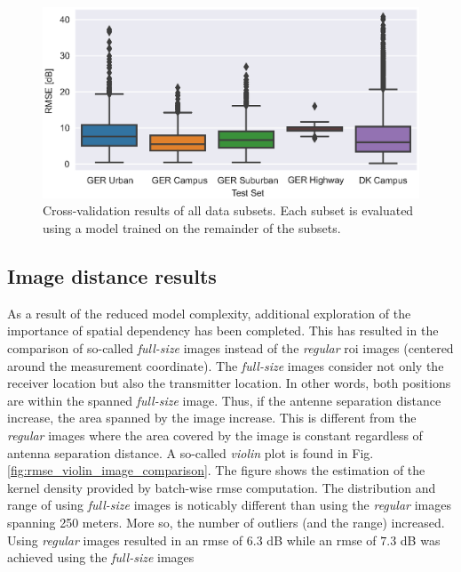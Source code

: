 \begin{figure}[h]
    \centering
    \includegraphics{chapters/part_pathloss/osm_images_paper/figures/RMSE_boxplot.eps}
    \caption{Cross-validation results of all data subsets. Each subset is evaluated using a model trained on the remainder of the subsets.}
    \label{fig:rmse_boxplot_osm}
\end{figure}

\subsection{Image distance results}
As a result of the reduced model complexity, additional exploration of the importance of spatial dependency has been completed. This has resulted in the comparison of so-called \emph{full-size} images instead of the \emph{regular} \gls{roi} images (centered around the measurement coordinate). The \emph{full-size} images consider not only the receiver location but also the transmitter location. In other words, both positions are within the spanned \emph{full-size} image. Thus, if the antenne separation distance increase, the area spanned by the image increase. This is different from the \emph{regular} images where the area covered by the image is constant regardless of antenna separation distance. A so-called \emph{violin} plot is found in Fig. \ref{fig:rmse_violin_image_comparison}. The figure shows the estimation of the kernel density provided by batch-wise \gls{rmse} computation. The distribution and range of using \emph{full-size} images is noticably different than using the \emph{regular} images spanning 250 meters. More so, the number of outliers (and the range) increased. Using \emph{regular} images resulted in an \gls{rmse} of $6.3$ dB while an \gls{rmse} of $7.3$ dB was achieved using the \emph{full-size} images



